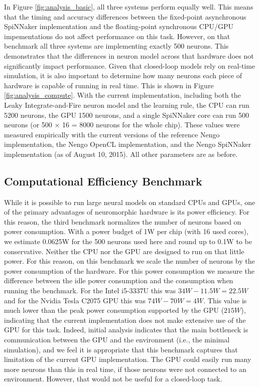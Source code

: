 \documentclass{frontiersSCNS} %
\begin{document}
In Figure \ref{fig:analysis_basic}, all three systems perform equally well.
This means that the timing and accuracy differences between the fixed-point
asynchronous SpiNNaker implementation and the floating-point synchronous
CPU/GPU impementations do not affect performance on this task.
However, on that benchmark all three systems are implementing exactly 500
neurons.  This demonstrates that the
differences in neuron model across that hardware does not significantly
impact performance.  Given that closed-loop models rely on real-time simulation,
it is also important to determine how many neurons each piece of hardware is capable of running in real time.
This is shown in Figure \ref{fig:analysis_compute}.  With the current
implementation, including both the Leaky Integrate-and-Fire neuron model
and the learning rule, the CPU can
run 5200 neurons, the GPU 1500 neurons, and a single SpiNNaker core can
run 500 neurons (or 500 $\times$ 16 = 8000 neurons for the whole chip).
These values were measured empirically with the current versions
of the reference Nengo implementation, the Nengo OpenCL implementation,
and the Nengo SpiNNaker implementation (as of August 10, 2015).  All other
parameters are as before.

\subsection{Computational Efficiency Benchmark}

While it is possible to run large neural models on standard CPUs and GPUs,
one of the primary advantages of neuromorphic hardware is its power
efficiency.  For this reason, the third benchmark normalizes the number of neurons
based on power consumption.  With a power budget of 1W per chip (with 16 used cores),
we estimate 0.0625W for the 500 neurons used here and round up to 0.1W to be
conservative.  Neither the CPU nor the
GPU are designed to run on that little power.  For this reason,
on this benchmark we scale the number of neurons by the power consumption of the hardware.
For this power consumption we measure the difference between the idle power
consumption and the consumption when running the benchmark.  For the Intel
i5-3337U this was $34W - 11.5W = 22.5W$ and for the Nvidia Tesla C2075 GPU
this was $74W - 70W = 4W$.  This value is much lower than the peak power
consumption supported by the GPU ($215W$), indicating that the current implementation
does not make extensive use of the GPU for this task.  Indeed, initial analysis indicates that
the main bottleneck is communication between the GPU and the environment (i.e.,
the minimal simulation), and we feel it is appropriate that this benchmark
captures that limitation of the current GPU implementation.  The GPU could easily
run many more neurons than this in real time, if those neurons were not connected
to an environment.  However, that would not be useful for a closed-loop task.
\end{document}
